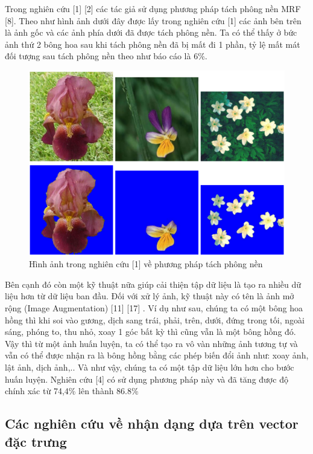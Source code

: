 \documentclass[12pt]{report}
\begin{document}
		Trong nghiên cứu [1] [2] các tác giả sử dụng phương pháp tách phông nền MRF [8]. Theo như hình ảnh dưới đây được lấy trong nghiên cứu [1] các ảnh bên trên là ảnh gốc và các ảnh phía dưới đã được tách phông nền. Ta có thể thấy ở bức ảnh thứ 2 bông hoa sau khi tách phông nền đã bị mất đi 1 phần, tỷ lệ mất mát đối tượng sau tách phông nền theo như báo cáo là 6\%.
																																														
		\begin{figure}[h]
			\centering
			\includegraphics[scale=0.6]{anh_tach_phong_nen}
			\caption{Hình ảnh trong nghiên cứu [1] về phương pháp tách phông nền}
			\label{fig:anh_tach_phong_nen}
		\end{figure}
																																														
		Bên cạnh đó còn một kỹ thuật nữa giúp cải thiện tập dữ liệu là tạo ra nhiều dữ liệu hơn từ dữ liệu ban đầu. Đối với xử lý ảnh, kỹ thuật này có tên là ảnh mở rộng (Image Augmentation) [11] [17] . Ví dụ như sau, chúng ta có một bông hoa hồng thì khi soi vào gương, dịch sang trái, phải, trên, dưới, đứng trong tối, ngoài sáng, phóng to, thu nhỏ, xoay 1 góc bất kỳ thì cũng vẫn là một bông hồng đó. Vậy thì từ một ảnh huấn luyện, ta có thể tạo ra vô vàn những ảnh tương tự và vẫn có thể được nhận ra là bông hồng bằng các phép biến đổi ảnh như: xoay ảnh, lật ảnh, dịch ảnh,.. Và như vậy, chúng ta có một tập dữ liệu lớn hơn cho bước huấn luyện. Nghiên cứu [4] có sử dụng phương pháp này và đã tăng được độ chính xác từ 74,4\% lên thành 86.8\%
																																														
		\subsection{Các nghiên cứu về nhận dạng dựa trên vector đặc trưng}
																																												
\end{document}
